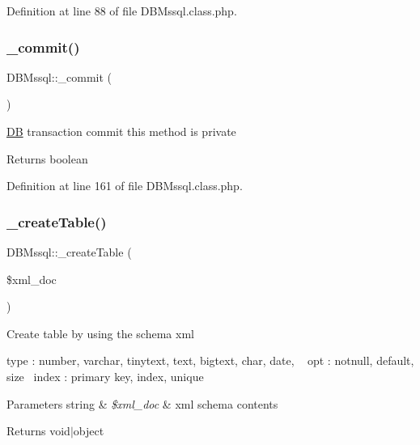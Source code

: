 Definition at line 88 of file D\+B\+Mssql.\+class.\+php.

\hypertarget{classDBMssql_a08f359cc1c5ce91fde7139446252e8c4}{}\label{classDBMssql_a08f359cc1c5ce91fde7139446252e8c4} 
\subsubsection{\texorpdfstring{\+\_\+commit()}{\_commit()}}
{\footnotesize\ttfamily D\+B\+Mssql\+::\+\_\+commit (\begin{DoxyParamCaption}{ }\end{DoxyParamCaption})}

\hyperlink{classDB}{DB} transaction commit this method is private \begin{DoxyReturn}{Returns}
boolean 
\end{DoxyReturn}


Definition at line 161 of file D\+B\+Mssql.\+class.\+php.

\hypertarget{classDBMssql_a0705365081b34014652f440380c53519}{}\label{classDBMssql_a0705365081b34014652f440380c53519} 
\subsubsection{\texorpdfstring{\+\_\+create\+Table()}{\_createTable()}}
{\footnotesize\ttfamily D\+B\+Mssql\+::\+\_\+create\+Table (\begin{DoxyParamCaption}\item[{}]{\$xml\+\_\+doc }\end{DoxyParamCaption})}

Create table by using the schema xml

type \+: number, varchar, tinytext, text, bigtext, char, date, ~\newline
opt \+: notnull, default, size~\newline
index \+: primary key, index, unique~\newline

\begin{DoxyParams}[1]{Parameters}
string & {\em \$xml\+\_\+doc} & xml schema contents \\
\hline
\end{DoxyParams}
\begin{DoxyReturn}{Returns}
void$\vert$object 
\end{DoxyReturn}


